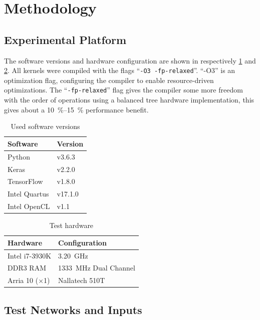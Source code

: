 \documentclass[techrep,english]{ipsj} %
\begin{document}
\section{Methodology}\label{sec:method}
\subsection{Experimental Platform}
The software versions and hardware configuration are shown in respectively \cref{tab:software-versions} and \cref{tab:test-hardware}.
All kernels were compiled with the flags ``\texttt{-O3 -fp-relaxed}''.
``-O3'' is an optimization flag, configuring the compiler to enable resource-driven optimizations. %
The ``\texttt{-fp-relaxed}'' flag gives the compiler some more freedom with the order of operations using a balanced tree hardware implementation, this gives about a \SIrange{10}{15}{\percent} performance benefit.%
\begin{table}[h]
  \centering
  \caption{Used software versions}\label{tab:software-versions}
  \begin{tabular}{ll}
    \toprule
    \textbf{Software} & \textbf{Version} \\
    \midrule
    Python & v3.6.3 \\
    Keras & v2.2.0 \\
    TensorFlow & v1.8.0 \\
    Intel Quartus & v17.1.0 \\
    Intel OpenCL & v1.1 \\
    \bottomrule
  \end{tabular}
\end{table}
\begin{table}[h]
  \centering
  \caption{Test hardware}\label{tab:test-hardware}
  \begin{tabular}{ll}
    \toprule
    \textbf{Hardware} & \textbf{Configuration} \\
    \midrule
    Intel i7-3930K & \SI{3.20}{\giga\hertz} \\
    DDR3 RAM & \SI{1333}{\mega\hertz} Dual Channel \\
    Arria 10 ($\times$1) & Nallatech 510T \\
    \bottomrule
  \end{tabular}
\end{table}

\subsection{Test Networks and Inputs}
\end{document}
